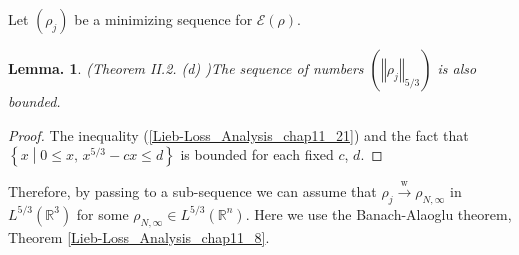 \documentclass[openany, a4paper, oneside]{jsbook}
\theoremstyle{break}
\theoremstyle{breakdefn}
\newtheorem{lem}[thm]{Lemma.}
\newcommand{\norm}[1]{\left\Vert#1\right\Vert}
\newcommand{\relmiddle}[1]{\mathrel{}\middle#1\mathrel{}}
\newcommand{\set}[2]{\left\{#1 \relmiddle| #2\right\}}
\newcommand{\bbRthree}{\mathbb{R}^3}
\newcommand{\bbRn}{\mathbb{R}^n}
\newcommand{\calE}{\mathcal{E}}
\newcommand{\rhoNinfty}{\rho_{N, \infty}}
\newcommand{\wto}{\xrightarrow{\text{w}}}
\begin{document}
Let $(\rho_j)$ be a minimizing sequence for $\calE (\rho)$.
\begin{lem}\textup{(Theorem II.2. (d) \cite{LiebSimon1})}\label{Lieb-Loss_Analysis_chap11_20}
 The sequence of numbers $(\norm{\rho_j}_{5/3})$ is also bounded.
\end{lem}
\begin{proof}
The inequality (\ref{Lieb-Loss_Analysis_chap11_21}) and the fact that $\set{x}{0 \leq x, \, x^{5/3} - cx \leq d}$ is bounded for each fixed $c$, $d$.
\end{proof}

Therefore, by passing to a sub-sequence we can assume that $\rho_j \wto \rhoNinfty$ in $L^{5/3} (\bbRthree)$ for some $\rhoNinfty \in L^{5/3} (\bbRn)$.
Here we use the Banach-Alaoglu theorem, Theorem \ref{Lieb-Loss_Analysis_chap11_8}.
\end{document}
